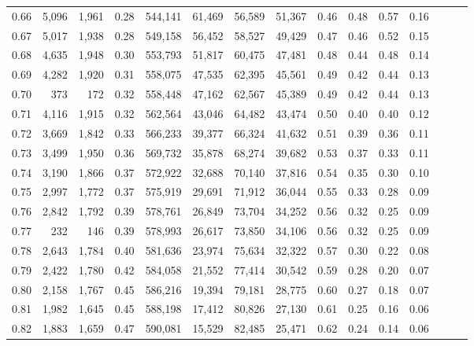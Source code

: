 \begin{tabular}{rrrrrrrrrrrrrrr}
0.66 &   5,096 &  1,961 &  0.28 &  544,141 &   61,469 &   56,589 &   51,367 &  0.46 &  0.48 &  0.57 &      0.16 \\
0.67 &   5,017 &  1,938 &  0.28 &  549,158 &   56,452 &   58,527 &   49,429 &  0.47 &  0.46 &  0.52 &      0.15 \\
0.68 &   4,635 &  1,948 &  0.30 &  553,793 &   51,817 &   60,475 &   47,481 &  0.48 &  0.44 &  0.48 &      0.14 \\
0.69 &   4,282 &  1,920 &  0.31 &  558,075 &   47,535 &   62,395 &   45,561 &  0.49 &  0.42 &  0.44 &      0.13 \\
0.70 &     373 &    172 &  0.32 &  558,448 &   47,162 &   62,567 &   45,389 &  0.49 &  0.42 &  0.44 &      0.13 \\
0.71 &   4,116 &  1,915 &  0.32 &  562,564 &   43,046 &   64,482 &   43,474 &  0.50 &  0.40 &  0.40 &      0.12 \\
0.72 &   3,669 &  1,842 &  0.33 &  566,233 &   39,377 &   66,324 &   41,632 &  0.51 &  0.39 &  0.36 &      0.11 \\
0.73 &   3,499 &  1,950 &  0.36 &  569,732 &   35,878 &   68,274 &   39,682 &  0.53 &  0.37 &  0.33 &      0.11 \\
0.74 &   3,190 &  1,866 &  0.37 &  572,922 &   32,688 &   70,140 &   37,816 &  0.54 &  0.35 &  0.30 &      0.10 \\
0.75 &   2,997 &  1,772 &  0.37 &  575,919 &   29,691 &   71,912 &   36,044 &  0.55 &  0.33 &  0.28 &      0.09 \\
0.76 &   2,842 &  1,792 &  0.39 &  578,761 &   26,849 &   73,704 &   34,252 &  0.56 &  0.32 &  0.25 &      0.09 \\
0.77 &     232 &    146 &  0.39 &  578,993 &   26,617 &   73,850 &   34,106 &  0.56 &  0.32 &  0.25 &      0.09 \\
0.78 &   2,643 &  1,784 &  0.40 &  581,636 &   23,974 &   75,634 &   32,322 &  0.57 &  0.30 &  0.22 &      0.08 \\
0.79 &   2,422 &  1,780 &  0.42 &  584,058 &   21,552 &   77,414 &   30,542 &  0.59 &  0.28 &  0.20 &      0.07 \\
0.80 &   2,158 &  1,767 &  0.45 &  586,216 &   19,394 &   79,181 &   28,775 &  0.60 &  0.27 &  0.18 &      0.07 \\
0.81 &   1,982 &  1,645 &  0.45 &  588,198 &   17,412 &   80,826 &   27,130 &  0.61 &  0.25 &  0.16 &      0.06 \\
0.82 &   1,883 &  1,659 &  0.47 &  590,081 &   15,529 &   82,485 &   25,471 &  0.62 &  0.24 &  0.14 &      0.06 \\

\end{tabular}
